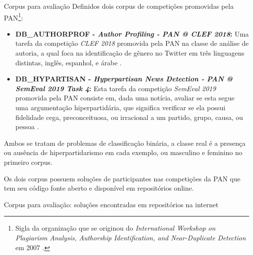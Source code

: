 \documentclass[%
  10pt,%
  aspectratio = 169,%
  compress,%
  t,%
]{beamer}%
\begin{document}
    \begin{frame}{}{Corpus para avaliação}
        Definidos dois corpus de competições promovidas pela PAN\footnote{Sigla da organização que se originou do \textit{International Workshop on Plagiarism Analysis, Authorship Identification, and Near-Duplicate Detection} em 2007 \cite{PAN_Workshop_2007}.}:
        \begin{itemize}
            \item \textbf{DB\_AUTHORPROF - \textit{Author Profiling - PAN @ CLEF 2018}:} Uma tarefa da competição \textit{CLEF 2018} promovida pela PAN na classe de análise de autoria, a qual foca na identificação de gênero no Twitter em três linguagens distintas, inglês, espanhol, e árabe \cite{PAN_APCLEF_2018}.
            
            \item \textbf{DB\_HYPARTISAN - \textit{Hyperpartisan News Detection - PAN @ SemEval 2019 Task 4}:} Esta tarefa da competição \textit{SemEval 2019} promovida pela PAN consiste em, dada uma notícia, avaliar se esta segue uma argumentação hiperpartidária, que significa verificar se ela possui fidelidade cega, preconceituosa, ou irracional a um partido, grupo, causa, ou pessoa \cite{PAN_HND_2019}.
        
        \end{itemize}
        
        Ambos se tratam de problemas de classificação binária, a classe real é a presença ou ausência de hiperpartidarismo em cada exemplo, ou masculino e feminino no primeiro corpus.
        
        Os dois corpus possuem soluções de participantes nas competições da PAN que tem seu código fonte aberto e disponível em repositórios online.
    \end{frame}
    
    \begin{frame}{}{Corpus para avaliação: soluções encontradas em repositórios na internet}
        
        
        
    \end{frame}
    
\end{document}
